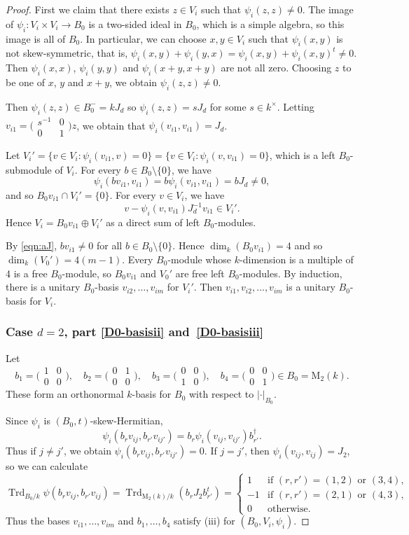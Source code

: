 \documentclass[JEP,XML,SOM,Unicode,NoFloatCountersInSection]{cedram}
\newcommand{\rM}{\mathrm{M}}
\DeclareMathOperator{\Trd}{Trd}
\newcommand{\abs}[1]{\lvert #1 \rvert}
\newcommand{\fullsmallmatrix}[4]{\bigl( \begin{smallmatrix} #1 & #2 \\ #3 & #4 \end{smallmatrix} \bigr)}
\begin{document}
\begin{proof}
First we claim that there exists $z \in V_i$ such that $\psi_i(z,z) \neq 0$.
The image of $\psi_i \colon V_i \times V_i \to B_0$ is a two-sided ideal in $B_0$, which is a simple algebra, so this image is all of $B_0$.
In particular, we can choose $x,y \in V_i$ such that $\psi_i(x,y)$ is not skew-symmetric, that is, $\psi_i(x,y) + \psi_i(y,x) = \psi_i(x,y) + \psi_i(x,y)^t \neq 0$.
Then $\psi_i(x,x)$, $\psi_i(y,y)$ and $\psi_i(x+y,x+y)$ are not all zero.
Choosing $z$ to be one of $x$, $y$ and $x+y$, we obtain $\psi_i(z,z) \neq 0$.

Then $\psi_i(z,z) \in B_0^- = k J_d$ so $\psi_i(z,z) = s J_d$ for some $s \in k^\times$.
Letting $v_{i1} = \fullsmallmatrix{s^{-1}}{0}{0}{1}z$, we obtain that $\psi_i(v_{i1}, v_{i1}) = J_d$.

Let $V_i' = \{ v \in V_i : \psi_i(v_{i1}, v) = 0 \} = \{ v \in V_i : \psi_i(v, v_{i1}) = 0 \}$, which is a left $B_0$-submodule of $V_i$.
For every $b \in B_0 \setminus \{0\}$, we have
\begin{equation} \label{eqn:aJ}
\psi_i(bv_{i1}, v_{i1}) = b\psi_i(v_{i1}, v_{i1}) = bJ_d \neq 0,
\end{equation}
and so $B_0v_{i1} \cap V_i' = \{ 0 \}$.
For every $v \in V_i$, we have
\[
v - \psi_i(v, v_{i1}) J_d^{-1} v_{i1} \in V_i'.
\]
Hence $V_i = B_0v_{i1} \oplus V_i'$ as a direct sum of left $B_0$-modules.

By \eqref{eqn:aJ}, $bv_{i1} \neq 0$ for all $b \in B_0 \setminus \{0\}$.
Hence $\dim_k(B_0v_{i1}) = 4$ and so $\dim_k(V_0') = 4(m-1)$.
Every $B_0$-module whose $k$-dimension is a multiple of 4 is a free $B_0$-module,
so $B_0v_{i1}$ and $V_0'$ are free left $B_0$-modules.
By induction, there is a unitary $B_0$-basis $v_{i2}, \dotsc, v_{im}$ for $V_i'$.
Then $v_{i1}, v_{i2}, \dotsc, v_{im}$ is a unitary $B_0$-basis for $V_i$.

\subsubsection*{Case $d=2$, part \eqref{D0-basisii} and~\eqref{D0-basisiii}}
Let
\[
b_1 = \fullsmallmatrix{1}{0}{0}{0},
\quad b_2 = \fullsmallmatrix{0}{1}{0}{0},
\quad b_3 = \fullsmallmatrix{0}{0}{1}{0},
\quad b_4 = \fullsmallmatrix{0}{0}{0}{1} \in B_0 = \rM_2(k).
\]
These form an orthonormal $k$-basis for $B_0$ with respect to $\abs{\cdot}_{B_0}$.

Since $\psi_i$ is $(B_0,t)$-skew-Hermitian,
\[
\psi_i(b_rv_{ij}, b_{r'}v_{ij'}) = b_r\psi_i(v_{ij}, v_{ij'})b_{r'}^\dag.
\]
Thus if $j \neq j'$, we obtain $\psi_i(b_rv_{ij}, b_{r'}v_{ij'}) = 0$.
If $j = j'$, then $\psi_i(v_{ij}, v_{ij}) = J_2$, so we can calculate
\[
\Trd_{B_0/k} \psi(b_rv_{ij}, b_{r'}v_{ij}) = \Trd_{\rM_2(k)/k}(b_rJ_2b_{r'}^t)
= \begin{cases}
1 &\text{if } (r,r') = (1,2) \text{ or } (3,4),
\\ -1 &\text{if } (r,r') = (2,1) \text{ or } (4,3),
\\ 0 &\text{otherwise}.
\end{cases}
\]
Thus the bases $v_{i1}, \dotsc, v_{im}$ and $b_1, \dotsc, b_4$ satisfy (iii) for $(B_0, V_i, \psi_i)$.
\end{proof}
\end{document}
